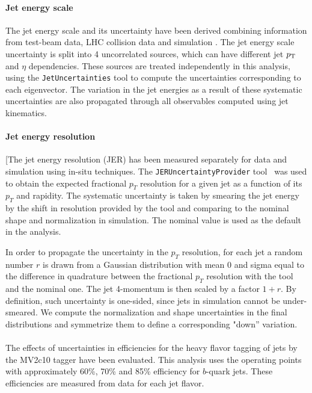 \paragraph{Jet energy scale}
The jet energy scale and its uncertainty have been derived combining information from test-beam data, 
LHC collision data and simulation \cite{JESwiki}. The jet
energy scale uncertainty is split into 4 uncorrelated sources, 
which can have different jet $p_{{\rm T}}$ and $\eta$ dependencies.  These sources are
treated independently in this analysis, using the \texttt{JetUncertainties} tool \cite{TWiki_JetUncertainties} 
to compute the uncertainties corresponding to each eigenvector. 
The variation in the jet energies as a result of these systematic uncertainties are also propagated through all
observables computed using jet kinematics.

\paragraph{Jet energy resolution}
[The jet energy resolution (JER) has been measured separately for data and simulation 
using in-situ techniques. The \texttt{JERUncertaintyProvider}
tool~\cite{jeruncertaintyprovider} was used to obtain the expected fractional
$p_T$ resolution for a given jet as a function of its $p_T$ and rapidity. 
The systematic uncertainty is taken by smearing the jet energy by the shift 
in resolution provided by the tool and comparing to the nominal
shape and normalization in simulation. 
The nominal value is used as the default in the analysis.

In order to propagate the uncertainty in the $p_T$ resolution, for each jet a 
random number $r$ is drawn from a Gaussian distribution with mean 0 and sigma equal 
 to the difference in quadrature between the fractional $p_T$ resolution with the tool and the nominal
one.  The jet 4-momentum is then scaled by a factor $1+r$.  By definition, such uncertainty
is one-sided, since jets in simulation cannot be under-smeared. 
We compute the normalization and shape uncertainties in the final distributions 
and symmetrize them to define a corresponding "down'' variation.

\paragraph{\btagging}

The effects of uncertainties in efficiencies for the heavy flavor tagging of jets by
the MV2c10 tagger have been evaluated. This analysis uses the operating points 
with approximately 60\%, 70\% and 85\% efficiency for $b$-quark jets. 
These efficiencies are measured
from data for each jet flavor.

